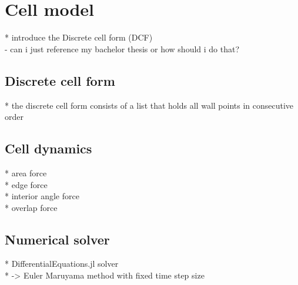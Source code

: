 \section{Cell model} 
* introduce the Discrete cell form (DCF) \\
- can i just reference my bachelor thesis or how should i do that? 

\subsection{Discrete cell form}
* the discrete cell form consists of a list that holds all wall points in consecutive order 

\subsection{Cell dynamics} 
* area force \\
* edge force \\
* interior angle force \\ 
* overlap force \\

\subsection{Numerical solver}
* DifferentialEquations.jl solver \\
* -> Euler Maruyama method with fixed time step size  \\